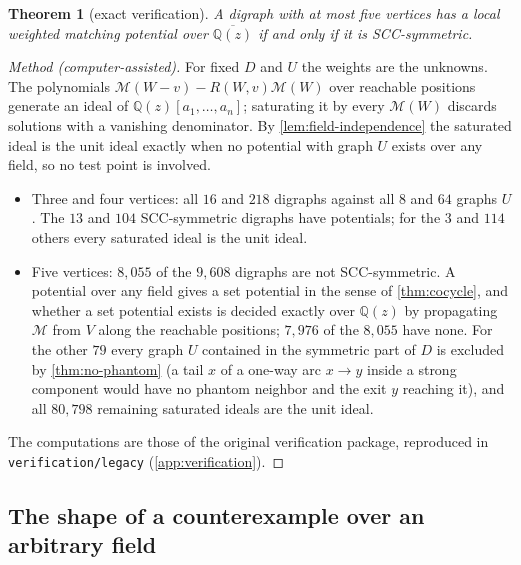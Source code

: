 \documentclass[11pt]{amsart}
\theoremstyle{plain}
\newtheorem{theorem}{Theorem}[section]
\theoremstyle{definition}
\theoremstyle{remark}
\numberwithin{equation}{section}
\newcommand{\code}[1]{{\ttfamily\nolinkurl{#1}}}
\newcommand{\QQ}{\mathbb{Q}}
\newcommand{\Qz}{\QQ(z)}
\newcommand{\Qzbar}{\overline{\QQ(z)}}
\newcommand{\Mpot}{\mathcal{M}}           %
\begin{document}
\begin{theorem}[exact verification]\label{thm:exact5}
A digraph with at most five vertices has a local weighted matching potential over $\Qzbar$ if and only if it is SCC-symmetric.
\end{theorem}
\begin{proof}[Method \textup{(computer-assisted)}]
For fixed $D$ and $U$ the weights are the unknowns. The polynomials $\Mpot(W-v)-R(W,v)\Mpot(W)$ over reachable positions generate an ideal of $\Qz[a_1,\dots,a_n]$; saturating it by every $\Mpot(W)$ discards solutions with a vanishing denominator. By \cref{lem:field-independence} the saturated ideal is the unit ideal exactly when no potential with graph $U$ exists over any field, so no test point is involved.
\begin{itemize}
\item Three and four vertices: all $16$ and $218$ digraphs against all $8$ and $64$ graphs $U$. The $13$ and $104$ SCC-symmetric digraphs have potentials; for the $3$ and $114$ others every saturated ideal is the unit ideal.
\item Five vertices: $8{,}055$ of the $9{,}608$ digraphs are not SCC-symmetric. A potential over any field gives a set potential in the sense of \cref{thm:cocycle}, and whether a set potential exists is decided exactly over $\Qz$ by propagating $\Mpot$ from $V$ along the reachable positions; $7{,}976$ of the $8{,}055$ have none. For the other $79$ every graph $U$ contained in the symmetric part of $D$ is excluded by \cref{thm:no-phantom} (a tail $x$ of a one-way arc $x\to y$ inside a strong component would have no phantom neighbor and the exit $y$ reaching it), and all $80{,}798$ remaining saturated ideals are the unit ideal.
\end{itemize}
The computations are those of the original verification package, reproduced in \code{verification/legacy} (\cref{app:verification}).
\end{proof}

\subsection{The shape of a counterexample over an arbitrary field}
\end{document}
